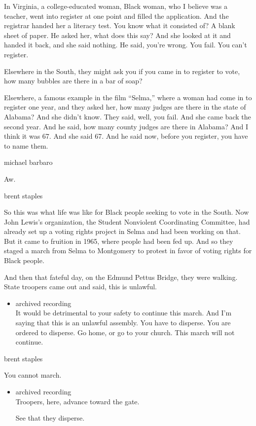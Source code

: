In Virginia, a college-educated woman, Black woman, who I believe was a
teacher, went into register at one point and filled the application. And
the registrar handed her a literacy test. You know what it consisted of?
A blank sheet of paper. He asked her, what does this say? And she looked
at it and handed it back, and she said nothing. He said, you're wrong.
You fail. You can't register.

Elsewhere in the South, they might ask you if you came in to register to
vote, how many bubbles are there in a bar of soap?

Elsewhere, a famous example in the film ``Selma,'' where a woman had
come in to register one year, and they asked her, how many judges are
there in the state of Alabama? And she didn't know. They said, well, you
fail. And she came back the second year. And he said, how many county
judges are there in Alabama? And I think it was 67. And she said 67. And
he said now, before you register, you have to name them.

michael barbaro

Aw.

brent staples

So this was what life was like for Black people seeking to vote in the
South. Now John Lewis's organization, the Student Nonviolent
Coordinating Committee, had already set up a voting rights project in
Selma and had been working on that. But it came to fruition in 1965,
where people had been fed up. And so they staged a march from Selma to
Montgomery to protest in favor of voting rights for Black people.

And then that fateful day, on the Edmund Pettus Bridge, they were
walking. State troopers came out and said, this is unlawful.

\begin{itemize}
\tightlist
\item
  archived recording\\
  It would be detrimental to your safety to continue this march. And I'm
  saying that this is an unlawful assembly. You have to disperse. You
  are ordered to disperse. Go home, or go to your church. This march
  will not continue.
\end{itemize}

brent staples

You cannot march.

\begin{itemize}
\item
  archived recording\\
  Troopers, here, advance toward the gate.

  See that they disperse.
\end{itemize}

